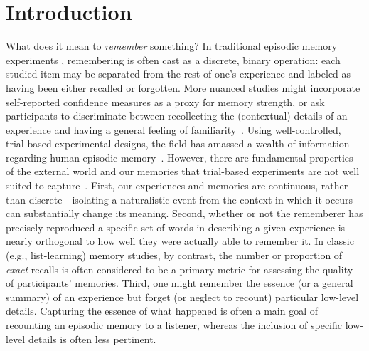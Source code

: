 \documentclass[10pt]{article}
\begin{document}
\section*{Introduction}
What does it mean to \textit{remember} something? In traditional episodic memory experiments \citep[e.g., list-learning or trial-based experiments;][]{Murd62a, Kaha96}, remembering is often cast as a discrete, binary operation: each studied item may be separated from the rest of one's experience and labeled as having been either recalled or forgotten. More nuanced studies might incorporate self-reported confidence measures as a proxy for memory strength, or ask participants to discriminate between recollecting the (contextual) details of an experience and having a general feeling of familiarity~\citep{Yone02}. Using well-controlled, trial-based experimental designs, the field has amassed a wealth of information regarding human episodic memory~\citep[for review see][]{Kaha12}.  However, there are fundamental properties of the external world and our memories that trial-based experiments are not well suited to capture~\citep[for review, also see][]{KoriGold94, HukEtal18}.  First, our experiences and memories are continuous, rather than discrete---isolating a naturalistic event from the context in which it occurs can substantially change its meaning.  Second, whether or not the rememberer has precisely reproduced a specific set of words in describing a given experience is nearly orthogonal to how well they were actually able to remember it.  In classic (e.g., list-learning) memory studies, by contrast, the number or proportion of \textit{exact} recalls is often considered to be a primary metric for assessing the quality of participants' memories.  Third, one might remember the essence (or a general summary) of an experience but forget (or neglect to recount) particular low-level details.  Capturing the essence of what happened is often a main goal of recounting an episodic memory to a listener, whereas the inclusion of specific low-level details is often less pertinent.
\end{document}
